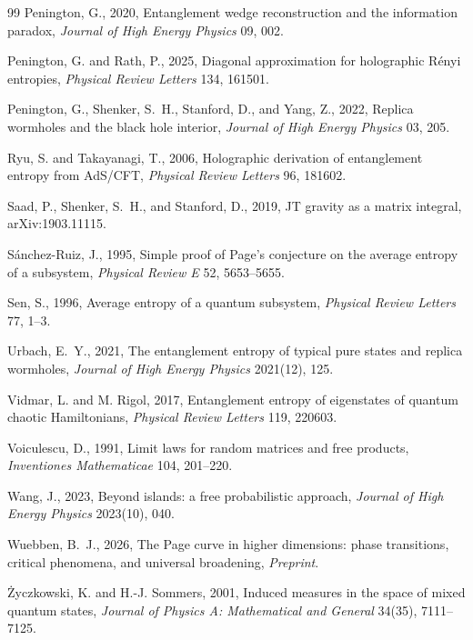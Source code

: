 \documentclass[11pt,letterpaper]{article}
\theoremstyle{plain}
\theoremstyle{definition}
\theoremstyle{remark}
\begin{document}
\begin{thebibliography}{99}
Penington, G., 2020, Entanglement wedge reconstruction and the information paradox, \textit{Journal of High Energy Physics} 09, 002.

Penington, G. and Rath, P., 2025, Diagonal approximation for holographic R\'enyi entropies, \textit{Physical Review Letters} 134, 161501.

Penington, G., Shenker, S.~H., Stanford, D., and Yang, Z., 2022, Replica wormholes and the black hole interior, \textit{Journal of High Energy Physics} 03, 205.

Ryu, S. and Takayanagi, T., 2006, Holographic derivation of entanglement entropy from AdS/CFT, \textit{Physical Review Letters} 96, 181602.

Saad, P., Shenker, S.~H., and Stanford, D., 2019, JT gravity as a matrix integral, arXiv:1903.11115.

S\'anchez-Ruiz, J., 1995, Simple proof of Page's conjecture on the average entropy of a subsystem, \textit{Physical Review E} 52, 5653--5655.

Sen, S., 1996, Average entropy of a quantum subsystem, \textit{Physical Review Letters} 77, 1--3.

Urbach, E.~Y., 2021, The entanglement entropy of typical pure states and replica wormholes, \textit{Journal of High Energy Physics} 2021(12), 125.

Vidmar, L. and M. Rigol, 2017, Entanglement entropy of eigenstates of quantum chaotic Hamiltonians, \textit{Physical Review Letters} 119, 220603.

Voiculescu, D., 1991, Limit laws for random matrices and free products, \textit{Inventiones Mathematicae} 104, 201--220.

Wang, J., 2023, Beyond islands: a free probabilistic approach, \textit{Journal of High Energy Physics} 2023(10), 040.


Wuebben, B.~J., 2026, The Page curve in higher dimensions: phase transitions, critical phenomena, and universal broadening, \textit{Preprint}.




\.{Z}yczkowski, K. and H.-J. Sommers, 2001, Induced measures in the space of mixed quantum states, \textit{Journal of Physics A: Mathematical and General} 34(35), 7111--7125.

\end{thebibliography}
\end{document}
